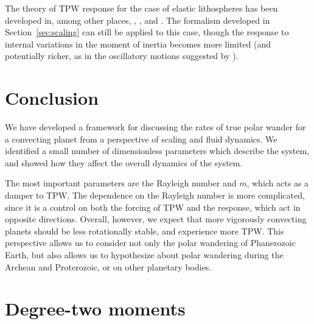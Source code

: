 \documentclass[preprint,12pt,authoryear]{elsarticle}
\begin{document}
The theory of TPW response for the case of elastic lithospheres has been developed in, among other places, 
\citet{matsuyama2006rotational}, \citet{creveling2012mechanisms}, and \citet{chan2014time}.
The formalism developed in Section~\ref{sec:scaling} can still be applied to this case, 
though the response to internal variations in the moment of inertia becomes more limited 
(and potentially richer, as in the oscillatory motions suggested by \citet{creveling2012mechanisms}).

\section{Conclusion}
We have developed a framework for discussing the rates of true polar wander for a convecting planet 
from a perspective of scaling and fluid dynamics.
We identified a small number of dimensionless parameters which describe the system, and showed how they affect the overall dynamics of the system.

The most important parameters are the Rayleigh number and $m$, which acts as a damper to TPW.
The dependence on the Rayleigh number is more complicated, since it is a control on both the forcing 
of TPW and the response, which act in opposite directions.
Overall, however, we expect that more vigorously convecting planets should be less rotationally stable, and experience more TPW.
This perspective allows us to consider not only the polar wandering of Phanerozoic Earth,
but also allows us to hypothesize about polar wandering during the Archean and Proterozoic, or 
on other planetary bodies.


% 
%



\section{Degree-two moments}
\label{appendix:moments}
\end{document}
